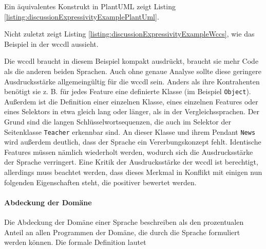     

    Ein äquivalentes Konstrukt in PlantUML zeigt Listing
    \ref{listing:discussionExpressivityExamplePlantUml}.

    

    Nicht zuletzt zeigt Listing \ref{listing:discussionExpressivityExampleWccs},
    wie das Beispiel in der \gls{wccdl} aussieht.

    

    Die \gls{wccdl} braucht in diesem Beispiel kompakt ausdrückt,
    braucht sie mehr Code als die anderen beiden Sprachen.
    Auch ohne genaue Analyse sollte diese geringere Ausdrucksstärke
    allgemeingültig für die \gls{wccdl} sein.
    Anders als ihre Kontrahenten benötigt sie z. B. für jedes Feature eine definierte Klasse
    (im Beispiel \texttt{Object}).
    Außerdem ist die Definition einer einzelnen Klasse,
    eines einzelnen Features oder eines Selektors in etwa gleich lang oder länger,
    als in der Vergleichssprachen.
    Der Grund sind die langen Schlüsselwortsequenzen,
    die auch im Selektor der Seitenklasse \texttt{Teacher}
    erkennbar sind.
    An dieser Klasse und ihrem Pendant \texttt{News}
    wird außerdem deutlich, dass der Sprache ein Vererbungskonzept fehlt.
    Identische Features müssen nämlich wiederholt werden,
    wodurch sich die Ausdrucksstärke der Sprache verringert.
    Eine Kritik der Ausdrucksstärke der \gls{wccdl} ist berechtigt,
    allerdings muss beachtet werden,
    dass dieses Merkmal in Konflikt mit einigen nun folgenden
    Eigenschaften steht, die positiver bewertet werden.


    \paragraph{Abdeckung der Domäne}
    Die Abdeckung der Domäne einer Sprache beschreiben
    \citet[Kapitel 4.2]{voelter:DslEngineering} als den
    prozentualen Anteil an allen Programmen der Domäne,
    die durch die Sprache formuliert werden können.
    Die formale Definition lautet

